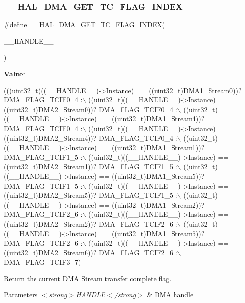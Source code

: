 \subsubsection{\texorpdfstring{\+\_\+\+\_\+\+H\+A\+L\+\_\+\+D\+M\+A\+\_\+\+G\+E\+T\+\_\+\+T\+C\+\_\+\+F\+L\+A\+G\+\_\+\+I\+N\+D\+EX}{\_\_HAL\_DMA\_GET\_TC\_FLAG\_INDEX}}
{\footnotesize\ttfamily \#define \+\_\+\+\_\+\+H\+A\+L\+\_\+\+D\+M\+A\+\_\+\+G\+E\+T\+\_\+\+T\+C\+\_\+\+F\+L\+A\+G\+\_\+\+I\+N\+D\+EX(\begin{DoxyParamCaption}\item[{}]{\+\_\+\+\_\+\+H\+A\+N\+D\+L\+E\+\_\+\+\_\+ }\end{DoxyParamCaption})}

{\bfseries Value\+:}
\begin{DoxyCode}
(((uint32\_t)((\_\_HANDLE\_\_)->Instance) == ((uint32\_t)DMA1\_Stream0))? DMA\_FLAG\_TCIF0\_4 :\(\backslash\)
 ((uint32\_t)((\_\_HANDLE\_\_)->Instance) == ((uint32\_t)DMA2\_Stream0))? DMA\_FLAG\_TCIF0\_4 :\(\backslash\)
 ((uint32\_t)((\_\_HANDLE\_\_)->Instance) == ((uint32\_t)DMA1\_Stream4))? DMA\_FLAG\_TCIF0\_4 :\(\backslash\)
 ((uint32\_t)((\_\_HANDLE\_\_)->Instance) == ((uint32\_t)DMA2\_Stream4))? DMA\_FLAG\_TCIF0\_4 :\(\backslash\)
 ((uint32\_t)((\_\_HANDLE\_\_)->Instance) == ((uint32\_t)DMA1\_Stream1))? DMA\_FLAG\_TCIF1\_5 :\(\backslash\)
 ((uint32\_t)((\_\_HANDLE\_\_)->Instance) == ((uint32\_t)DMA2\_Stream1))? DMA\_FLAG\_TCIF1\_5 :\(\backslash\)
 ((uint32\_t)((\_\_HANDLE\_\_)->Instance) == ((uint32\_t)DMA1\_Stream5))? DMA\_FLAG\_TCIF1\_5 :\(\backslash\)
 ((uint32\_t)((\_\_HANDLE\_\_)->Instance) == ((uint32\_t)DMA2\_Stream5))? DMA\_FLAG\_TCIF1\_5 :\(\backslash\)
 ((uint32\_t)((\_\_HANDLE\_\_)->Instance) == ((uint32\_t)DMA1\_Stream2))? DMA\_FLAG\_TCIF2\_6 :\(\backslash\)
 ((uint32\_t)((\_\_HANDLE\_\_)->Instance) == ((uint32\_t)DMA2\_Stream2))? DMA\_FLAG\_TCIF2\_6 :\(\backslash\)
 ((uint32\_t)((\_\_HANDLE\_\_)->Instance) == ((uint32\_t)DMA1\_Stream6))? DMA\_FLAG\_TCIF2\_6 :\(\backslash\)
 ((uint32\_t)((\_\_HANDLE\_\_)->Instance) == ((uint32\_t)DMA2\_Stream6))? DMA\_FLAG\_TCIF2\_6 :\(\backslash\)
   DMA\_FLAG\_TCIF3\_7)
\end{DoxyCode}


Return the current D\+MA Stream transfer complete flag. 


\begin{DoxyParams}{Parameters}
{\em $<$strong$>$\+H\+A\+N\+D\+L\+E$<$/strong$>$} & D\+MA handle \\
\hline
\end{DoxyParams}

